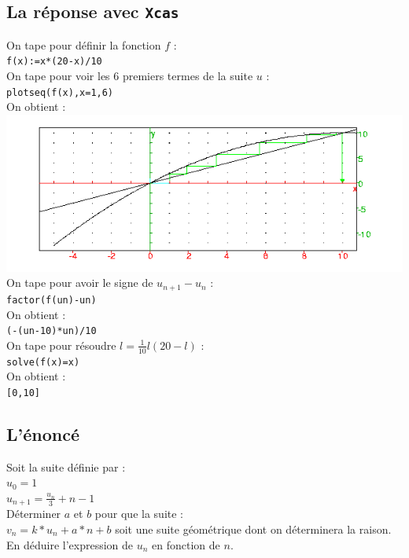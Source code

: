 \documentclass[a4paper,11pt]{book}
\begin{document}
\subsection{La r\'eponse avec {\tt Xcas}}
On tape pour d\'efinir la fonction $f$ :\\
{\tt f(x):=x*(20-x)/10}\\
On tape pour voir les 6 premiers termes de la suite $u$ :\\
{\tt plotseq(f(x),x=1,6)}\\
On obtient :\\
 \includegraphics[width=\textwidth]{suiterec}\\
On tape pour avoir le signe de $u_{n+1}-u_n$ :\\
{\tt factor(f(un)-un)}\\
On obtient :\\
{\tt (-(un-10)*un)/10}\\
On tape pour r\'esoudre $l=\frac{1}{10}l(20-l)$ :\\
{\tt solve(f(x)=x)}\\
On obtient :\\
{\tt [0,10]}\\
\subsection{L'\'enonc\'e}
Soit la suite d\'efinie par :\\
$u_0=1$\\
$u_{n+1}=\frac{u_n}{3}+n-1$\\
D\'eterminer $a$ et $b$ pour que la suite :\\
$v_n=k*u_n+a*n+b$ soit une suite g\'eom\'etrique dont on d\'eterminera la 
raison.\\
En d\'eduire l'expression de $u_n$ en fonction de $n$.
\end{document}
